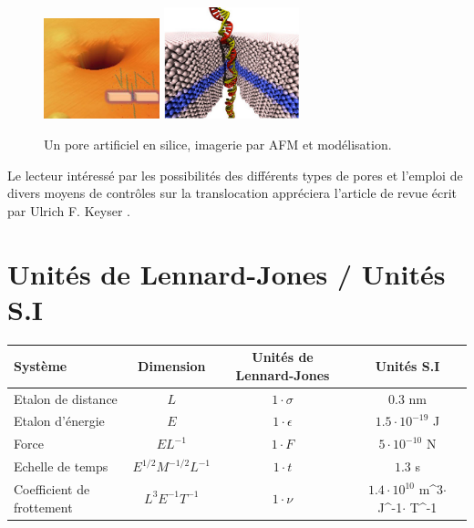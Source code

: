 \documentclass[a4paper,11pt]{article}
\begin{document}
\begin{figure}[H]
\begin{center}
\includegraphics[width=0.3\textwidth]{artificialpore.png} \hspace{0.02\textwidth}
\includegraphics[width=0.35\textwidth]{nanoporeart.jpg}

\caption{Un pore artificiel en silice, imagerie par AFM et modélisation.}
\label{artificialpore}
\end{center}
\end{figure}

Le lecteur intéressé par les possibilités des différents types de pores et l'emploi de divers moyens de contrôles sur la translocation appréciera l'article de revue écrit par Ulrich F. Keyser \cite{keyser}. 

\section*{Unités de Lennard-Jones / Unités S.I}
\begin{center}


\begin{tabular}{|l|c|c|c|}
  \hline
 Système & Dimension & Unités de Lennard-Jones & Unités S.I \\
  \hline
  Etalon de distance & $L$ & $1\cdot\sigma$ & 0.3 nm \\
  Etalon d'énergie & $E$ & $1\cdot\epsilon$ & $1.5\cdot10^{-19}$ J\\
  Force & $E L^{-1}$ & $1\cdot F$ & $5\cdot10^{-10}$ N\\
     
  Echelle de temps & $E^{1/2} M^{-1/2} L^{-1} $ & $1\cdot t$ & $1.3$ s\\
   Coefficient de frottement & $ L^3 E^{-1} T^{-1}$ & $1\cdot \nu$ & $1.4\cdot10^{10}$ m^{3}$\cdot$ J^{-1}$\cdot$ T^{-1}\\
   
  \hline
\end{tabular}
\end{center}
\end{document}
